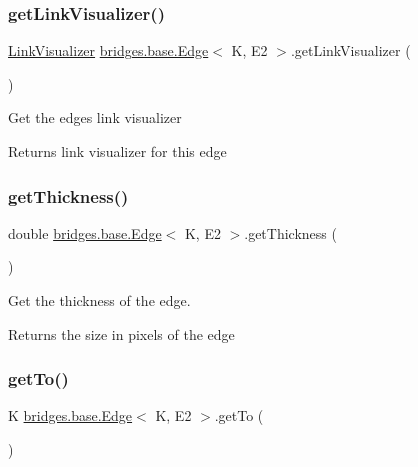 \subsubsection{\texorpdfstring{get\+Link\+Visualizer()}{getLinkVisualizer()}}
{\footnotesize\ttfamily \mbox{\hyperlink{classbridges_1_1base_1_1_link_visualizer}{Link\+Visualizer}} \mbox{\hyperlink{classbridges_1_1base_1_1_edge}{bridges.\+base.\+Edge}}$<$ K, E2 $>$.get\+Link\+Visualizer (\begin{DoxyParamCaption}{ }\end{DoxyParamCaption})}

Get the edge\textquotesingle{}s link visualizer \begin{DoxyReturn}{Returns}
link visualizer for this edge 
\end{DoxyReturn}
\mbox{\label{classbridges_1_1base_1_1_edge_a3431e83235fc5d5dd5cf747ed4853881}} 
\subsubsection{\texorpdfstring{get\+Thickness()}{getThickness()}}
{\footnotesize\ttfamily double \mbox{\hyperlink{classbridges_1_1base_1_1_edge}{bridges.\+base.\+Edge}}$<$ K, E2 $>$.get\+Thickness (\begin{DoxyParamCaption}{ }\end{DoxyParamCaption})}



Get the thickness of the edge. 

\begin{DoxyReturn}{Returns}
the size in pixels of the edge 
\end{DoxyReturn}
\mbox{\label{classbridges_1_1base_1_1_edge_ab451c13aa8173b5ef1cc2b2dd4f8508f}} 
\subsubsection{\texorpdfstring{get\+To()}{getTo()}}
{\footnotesize\ttfamily K \mbox{\hyperlink{classbridges_1_1base_1_1_edge}{bridges.\+base.\+Edge}}$<$ K, E2 $>$.get\+To (\begin{DoxyParamCaption}{ }\end{DoxyParamCaption})}



